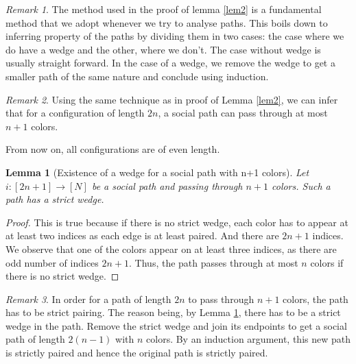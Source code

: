 \documentclass[12pt]{amsart}
\newtheorem{lemma}[thm]{Lemma}
\theoremstyle{definition}
\theoremstyle{remark}
\newtheorem{remark}{Remark}
\begin{document}
\begin{remark} \label{rem1}
The method used in the proof of lemma \ref{lem2} is a fundamental method that we adopt whenever we try to analyse paths. This boils down to inferring property of the paths by dividing them in two cases: the case where we do have a wedge and the other, where we don't. The case without wedge is usually straight forward. In the case of a wedge, we remove the wedge to get a smaller
path of the same nature and conclude using induction.
\end{remark}


\begin{remark}\label{rem2}
Using the same technique as in proof of Lemma \ref{lem2}, we can infer that for a configuration of length $2n$, a social path can pass through at most $n+1$ colors. 
\end{remark}



From now on, all configurations are of even length.


\begin{lemma}[Existence of a wedge for a social path with n+1 colors]\label{lem3}
Let $i:[2n+1] \to [N]$ be a social path and passing through $n+1$ colors. Such a path has a strict wedge. 
\end{lemma}

\begin{proof}
This is true because if there is no strict wedge, each color has to appear at at least two indices as each edge is at least paired. And there are $2n+1$ indices. We observe that one of the colors appear on at least three indices, as there are odd number of indices $2n+1$. Thus, the path passes through at most $n$ colors if there is no strict wedge.
\end{proof}



\begin{remark} \label{rem3.0}
In order for a path of length $2n$ to pass through $n+1$ colors, the path has to be strict pairing. The reason being, by Lemma \ref{lem3}, there has to be a strict wedge in the path. Remove the strict wedge and join its endpoints to get a social path of length $2(n-1)$ with $n$ colors. By an induction argument, this new path is strictly paired and hence the original path is strictly paired.\\

\end{remark}
\end{document}
